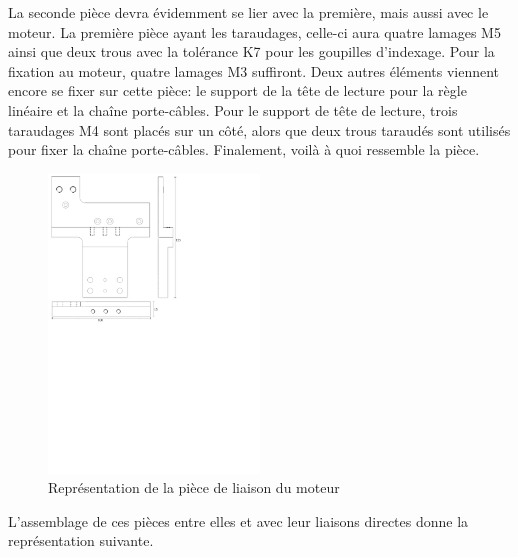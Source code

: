 La seconde pièce devra évidemment se lier avec la première, mais aussi avec le moteur. La première pièce ayant les taraudages, celle-ci aura
quatre lamages M5 ainsi que deux trous avec la tolérance K7 pour les goupilles d'indexage. Pour la fixation au moteur, quatre lamages M3 suffiront. Deux autres
éléments viennent encore se fixer sur cette pièce: le support de la tête de lecture pour la règle linéaire et la chaîne porte-câbles. Pour le
support de tête de lecture, trois taraudages M4 sont placés sur un côté, alors que deux trous taraudés sont utilisés pour fixer la chaîne
porte-câbles. Finalement, voilà à quoi ressemble la pièce.

\begin{figure}[H]
  \centering
  \includegraphics[width = 0.5\textwidth]{assets/figures/LiaisonMoteur.svg}
  \caption{Représentation de la pièce de liaison du moteur}
  \label{fig:LiaisonMoteur}
\end{figure}

L'assemblage de ces pièces entre elles et avec leur liaisons directes donne la représentation suivante.

